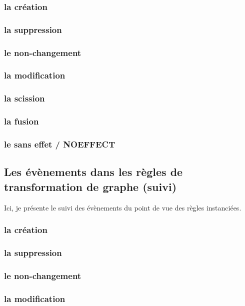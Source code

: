 \documentclass[11pt]{article}
\begin{document}
\subsubsection{la création}
\label{sec:org80c6317}
\subsubsection{la suppression}
\label{sec:org6f288ee}
\subsubsection{le non-changement}
\label{sec:orgb6b7f0b}
\subsubsection{la modification}
\label{sec:org5a20036}
\subsubsection{la scission}
\label{sec:org85d5eda}
\subsubsection{la fusion}
\label{sec:orgaa86a84}
\subsubsection{le sans effet / NOEFFECT}
\label{sec:org3f392d5}
\subsection{Les évènements dans les règles de transformation de graphe (suivi)}
\label{sec:org889829a}
Ici, je présente le suivi des évènements du point de vue des règles instanciées.
\subsubsection{la création}
\label{sec:org6079086}
\subsubsection{la suppression}
\label{sec:orgeefe671}
\subsubsection{le non-changement}
\label{sec:org7165f70}
\subsubsection{la modification}
\label{sec:orgfb597b2}
\end{document}
